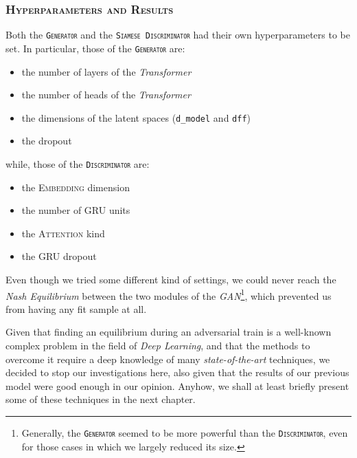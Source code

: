 \subsubsection{\textsc{Hyperparameters and Results}}

Both the \texttt{\textsc{Generator}} and the \texttt{\textsc{Siamese Discriminator}} had their own hyperparameters to be set.
In particular, those of the \texttt{\textsc{Generator}} are:
\begin{itemize}
    \item the number of layers of the \textit{Transformer}
    \item the number of heads  of the \textit{Transformer}
    \item the dimensions of the latent spaces (\texttt{d\_model} and \texttt{dff})
    \item the dropout
\end{itemize}
while, those of the \texttt{\textsc{Discriminator}} are:
\begin{itemize}
    \item the \textsc{Embedding} dimension
    \item the number of \textsc{GRU} units
    \item the \textsc{Attention} kind
    \item the \textsc{GRU} dropout
\end{itemize}

Even though we tried some different kind of settings, we could never reach the \textit{Nash Equilibrium} between the two modules of the \textit{GAN}\footnote{
    Generally, the \texttt{\textsc{Generator}} seemed to be more powerful than the \texttt{\textsc{Discriminator}}, even for those cases in which we largely reduced its size.
}, which prevented us from having any fit sample at all.

Given that finding an equilibrium during an adversarial train is a well-known complex problem in the field of \textit{Deep Learning}, and that the methods to overcome it require a deep knowledge of many \textit{state-of-the-art} techniques, we decided to stop our investigations here, also given that the results of our previous model were good enough in our opinion.
Anyhow, we shall at least briefly present some of these techniques in the next chapter.